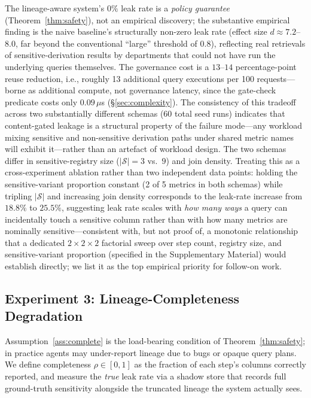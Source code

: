 \documentclass[nolineno]{ieeeaccess}
\begin{document}
The lineage-aware system's $0\%$ leak rate is a \emph{policy guarantee}
(Theorem~\ref{thm:safety}), not an empirical discovery; the substantive
empirical finding is the naive baseline's structurally non-zero leak rate
(effect size $d \approx 7.2$--$8.0$, far beyond the conventional ``large''
threshold of $0.8$), reflecting real retrievals of sensitive-derivation
results by departments that could not have run the underlying queries
themselves.
The governance cost is a $13$--$14$ percentage-point reuse reduction,
i.e., roughly 13 additional query executions per 100 requests---borne as
additional compute, not governance latency, since the gate-check predicate
costs only $0.09\,\mu$s (\S\ref{sec:complexity}).
The consistency of this tradeoff across two substantially different schemas
(60 total seed runs) indicates that content-gated leakage is a structural
property of the failure mode---any workload mixing sensitive and
non-sensitive derivation paths under shared metric names will exhibit it---rather
than an artefact of workload design.
The two schemas differ in sensitive-registry size ($|\mathcal{S}|{=}3$ vs.\
$9$) and join density.
Treating this as a cross-experiment ablation rather than two independent
data points: holding the sensitive-variant proportion constant (2 of 5
metrics in both schemas) while tripling $|\mathcal{S}|$ and increasing join
density corresponds to the leak-rate increase from $18.8\%$ to $25.5\%$,
suggesting leak rate scales with \emph{how many ways} a query can
incidentally touch a sensitive column rather than with how many metrics are
nominally sensitive---consistent with, but not proof of, a monotonic
relationship that a dedicated $2{\times}2{\times}2$ factorial sweep over
step count, registry size, and sensitive-variant proportion (specified in
the Supplementary Material) would establish directly; we list it as the top
empirical priority for follow-on work.

\subsection{Experiment 3: Lineage-Completeness Degradation}
\label{sec:degradation}

Assumption~\ref{ass:complete} is the load-bearing condition of
Theorem~\ref{thm:safety}; in practice agents may under-report lineage due to
bugs or opaque query plans.
We define completeness $\rho \in [0,1]$ as the fraction of each step's
columns correctly reported, and measure the \emph{true} leak rate via a
shadow store that records full ground-truth sensitivity alongside the
truncated lineage the system actually sees.
\end{document}
